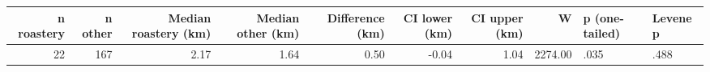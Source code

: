 \begingroup\footnotesize
\begin{tabular}{rrrrrrrrll}
  \toprule
n roastery & n other & Median roastery (km) & Median other (km) & Difference (km) & CI lower (km) & CI upper (km) & W & p (one-tailed) & Levene p \\ 
  \midrule
 22 & 167 & 2.17 & 1.64 & 0.50 & -0.04 & 1.04 & 2274.00 & .035 & .488 \\ 
   \bottomrule
\end{tabular}
\endgroup
